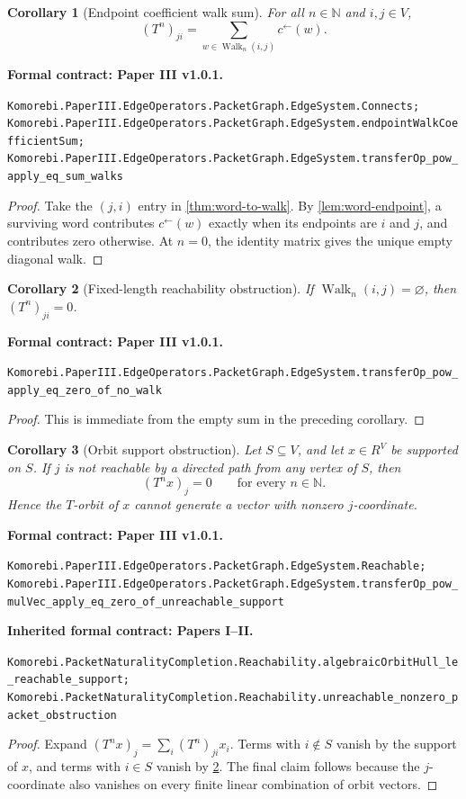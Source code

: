 \documentclass[11pt,a4paper]{article}
\theoremstyle{plain}
\newtheorem{corollary}[corollary]{Corollary}
\theoremstyle{definition}
\theoremstyle{remark}
\newcommand{\N}{\mathbb N}
\newcommand{\Walk}{\operatorname{Walk}}
\newcommand{\leanname}[1]{\nolinkurl{#1}}
\newcommand{\statusleanthree}[1]{\par\smallskip\noindent\begin{minipage}{\linewidth}{\color{leanblue}\textbf{Formal contract: Paper III v1.0.1.}}\par\begingroup\small\raggedright\leanname{#1}\par\endgroup\end{minipage}\par\smallskip}
\newcommand{\statusleanprior}[1]{\par\smallskip\noindent\begin{minipage}{\linewidth}{\color{leanblue}\textbf{Inherited formal contract: Papers I--II.}}\par\begingroup\small\raggedright\leanname{#1}\par\endgroup\end{minipage}\par\smallskip}
\begin{document}
\begin{corollary}[Endpoint coefficient walk sum]
\label{cor:word-to-walk-entry}
For all $n\in\N$ and $i,j\in V$,
\[
  \boxed{
  (T^n)_{ji}
  =
  \sum_{w\in\Walk_n(i,j)}c^\leftarrow(w).
  }
\]
\end{corollary}
\statusleanthree{Komorebi.PaperIII.EdgeOperators.PacketGraph.EdgeSystem.Connects; Komorebi.PaperIII.EdgeOperators.PacketGraph.EdgeSystem.endpointWalkCoefficientSum; Komorebi.PaperIII.EdgeOperators.PacketGraph.EdgeSystem.transferOp_pow_apply_eq_sum_walks}

\begin{proof}
Take the $(j,i)$ entry in \cref{thm:word-to-walk}.  By
\cref{lem:word-endpoint}, a surviving word contributes
$c^\leftarrow(w)$ exactly when its endpoints are $i$ and $j$, and contributes
zero otherwise.  At $n=0$, the identity matrix gives the unique empty
diagonal walk.
\end{proof}

\begin{corollary}[Fixed-length reachability obstruction]
\label{cor:fixed-reachability}
If $\Walk_n(i,j)=\varnothing$, then $(T^n)_{ji}=0$.
\end{corollary}
\statusleanthree{Komorebi.PaperIII.EdgeOperators.PacketGraph.EdgeSystem.transferOp_pow_apply_eq_zero_of_no_walk}

\begin{proof}
This is immediate from the empty sum in the preceding corollary.
\end{proof}

\begin{corollary}[Orbit support obstruction]
\label{cor:orbit-reachability}
Let $S\subseteq V$, and let $x\in R^V$ be supported on $S$.  If $j$ is not
reachable by a directed path from any vertex of $S$, then
\[
  (T^nx)_j=0\qquad\text{for every }n\in\N.
\]
Hence the $T$-orbit of $x$ cannot generate a vector with nonzero
$j$-coordinate.
\end{corollary}
\statusleanthree{Komorebi.PaperIII.EdgeOperators.PacketGraph.EdgeSystem.Reachable; Komorebi.PaperIII.EdgeOperators.PacketGraph.EdgeSystem.transferOp_pow_mulVec_apply_eq_zero_of_unreachable_support}
\statusleanprior{Komorebi.PacketNaturalityCompletion.Reachability.algebraicOrbitHull_le_reachable_support; Komorebi.PacketNaturalityCompletion.Reachability.unreachable_nonzero_packet_obstruction}

\begin{proof}
Expand $(T^nx)_j=\sum_i(T^n)_{ji}x_i$.  Terms with $i\notin S$ vanish by
the support of $x$, and terms with $i\in S$ vanish by
\cref{cor:fixed-reachability}.  The final claim follows because the
$j$-coordinate also vanishes on every finite linear combination of orbit
vectors.
\end{proof}
\end{document}
